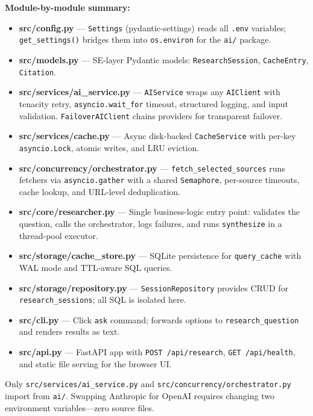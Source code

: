 \documentclass[11pt,a4paper]{article}
\begin{document}
\textbf{Module-by-module summary:}

\begin{itemize}[nosep,leftmargin=1.2em]
  \item \textbf{src/config.py} --- \texttt{Settings} (pydantic-settings) reads all \texttt{.env} variables; \texttt{get\_settings()} bridges them into \texttt{os.environ} for the \texttt{ai/} package.
  \item \textbf{src/models.py} --- SE-layer Pydantic models: \texttt{ResearchSession}, \texttt{CacheEntry}, \texttt{Citation}.
  \item \textbf{src/services/ai\_service.py} --- \texttt{AIService} wraps any \texttt{AIClient} with tenacity retry, \texttt{asyncio.wait\_for} timeout, structured logging, and input validation. \texttt{FailoverAIClient} chains providers for transparent failover.
  \item \textbf{src/services/cache.py} --- Async disk-backed \texttt{CacheService} with per-key \texttt{asyncio.Lock}, atomic writes, and LRU eviction.
  \item \textbf{src/concurrency/orchestrator.py} --- \texttt{fetch\_selected\_sources} runs fetchers via \texttt{asyncio.gather} with a shared \texttt{Semaphore}, per-source timeouts, cache lookup, and URL-level deduplication.
  \item \textbf{src/core/researcher.py} --- Single business-logic entry point: validates the question, calls the orchestrator, logs failures, and runs \texttt{synthesize} in a thread-pool executor.
  \item \textbf{src/storage/cache\_store.py} --- SQLite persistence for \texttt{query\_cache} with WAL mode and TTL-aware SQL queries.
  \item \textbf{src/storage/repository.py} --- \texttt{SessionRepository} provides CRUD for \texttt{research\_sessions}; all SQL is isolated here.
  \item \textbf{src/cli.py} --- Click \texttt{ask} command; forwards options to \texttt{research\_question} and renders results as text.
  \item \textbf{src/api.py} --- FastAPI app with \texttt{POST /api/research}, \texttt{GET /api/health}, and static file serving for the browser UI.
\end{itemize}

Only \texttt{src/services/ai\_service.py} and \texttt{src/concurrency/orchestrator.py} import from \texttt{ai/}. Swapping Anthropic for OpenAI requires changing two environment variables---zero source files.
\end{document}
